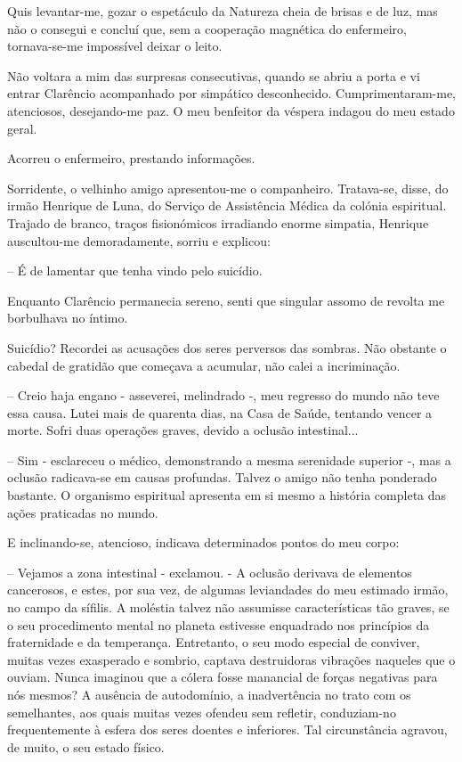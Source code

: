 \documentclass[portuguese,12pt,a4paper]{scrbook}
\begin{document}
	Quis levantar-me, gozar o espetáculo da Natureza cheia de brisas e de luz, mas não o consegui e concluí que, sem a cooperação magnética do enfermeiro, tornava-se-me impossível deixar o leito.
	
	Não voltara a mim das surpresas consecutivas, quando se abriu a porta e vi entrar Clarêncio acompanhado por simpático desconhecido. Cumprimentaram-me, atenciosos, desejando-me paz. O meu benfeitor da véspera indagou do meu estado geral.
	
	Acorreu o enfermeiro, prestando informações.
	
	Sorridente, o velhinho amigo apresentou-me o companheiro. Tratava-se, disse, do irmão Henrique de Luna, do Serviço de Assistência Médica da colónia espiritual. Trajado de branco, traços fisionómicos irradiando enorme simpatia, Henrique auscultou-me demoradamente, sorriu e explicou:
	
	– É de lamentar que tenha vindo pelo suicídio.
	
	Enquanto Clarêncio permanecia sereno, senti que singular assomo de revolta me borbulhava no íntimo.
	
	
	Suicídio? Recordei as acusações dos seres perversos das sombras. Não obstante o cabedal de gratidão que começava a acumular, não calei a incriminação.
	
	– Creio haja engano - asseverei, melindrado -, meu regresso do mundo não teve essa causa. Lutei mais de quarenta dias, na Casa de Saúde, tentando vencer a morte. Sofri duas operações graves, devido a oclusão intestinal...
	
	– Sim - esclareceu o médico, demonstrando a mesma serenidade superior -, mas a oclusão radicava-se em causas profundas. Talvez o amigo não tenha ponderado bastante. O organismo espiritual apresenta em si mesmo a história completa das ações praticadas no mundo.
	
	E inclinando-se, atencioso, indicava determinados pontos do meu corpo:
	
	– Vejamos a zona intestinal - exclamou. - A oclusão derivava de elementos cancerosos, e estes, por sua vez, de algumas leviandades do meu estimado irmão, no campo da sífilis. A moléstia talvez não assumisse características tão graves, se o seu procedimento mental no planeta estivesse enquadrado nos princípios da fraternidade e da temperança. Entretanto, o seu modo especial de conviver, muitas vezes exasperado e sombrio, captava destruidoras vibrações naqueles que o ouviam. Nunca imaginou que a cólera fosse manancial de forças negativas para nós mesmos? A ausência de autodomínio, a inadvertência no trato com os semelhantes, aos quais muitas vezes ofendeu sem refletir, conduziam-no frequentemente à esfera dos seres doentes e inferiores. Tal circunstância agravou, de muito, o seu estado físico.
	
\end{document}

